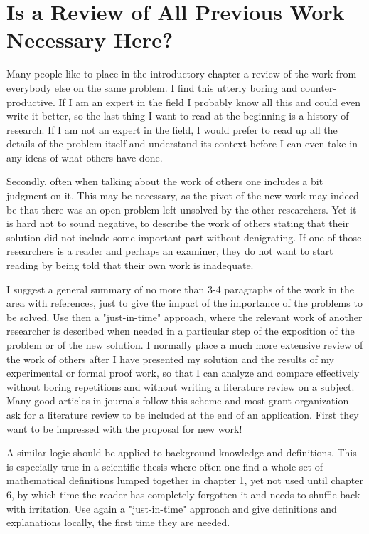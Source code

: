\section{Is a Review of All Previous Work Necessary Here?}

Many people like to place in the introductory chapter a review of the work from everybody else on the same problem. I find this utterly boring and counter-productive. If I am an expert in the field I probably know all this and could even write it better, so the last thing I want to read at the beginning is a history of research. If I am not an expert in the field, I would prefer to read up all the details of the problem itself and understand its context before I can even take in any ideas of what others have done.

Secondly, often when talking about the work of others one includes a bit judgment on it. This may be necessary, as the pivot of the new work may indeed be that there was an open problem left unsolved by the other researchers. Yet it is hard not to sound negative, to describe the work of others stating that their solution did not include some important part without denigrating. If one of those researchers is a reader and perhaps an examiner, they do not want to start reading by being told that their own work is inadequate.

I suggest a general summary of no more than 3-4 paragraphs of the work in the area with references, just to give the impact of the importance of the problems to be solved. Use then a "just-in-time" approach, where the relevant work of another researcher is described when needed in a particular step of the exposition of the problem or of the new solution. I normally place a much more extensive review of the work of others after I have presented my solution and the results of my experimental or formal proof work, so that I can analyze and compare effectively without boring repetitions and without writing a literature review on a subject. Many good articles in journals follow this scheme and most grant organization ask for a literature review to be included at the end of an application. First they want to be impressed with the proposal for new work!

A similar logic should be applied to background knowledge and definitions. This is especially true in a scientific thesis where often one find a whole set of mathematical definitions lumped together in chapter 1, yet not used until chapter 6, by which time the reader has completely forgotten it and needs to shuffle back with irritation. Use again a "just-in-time" approach and give definitions and explanations locally, the first time they are needed.




